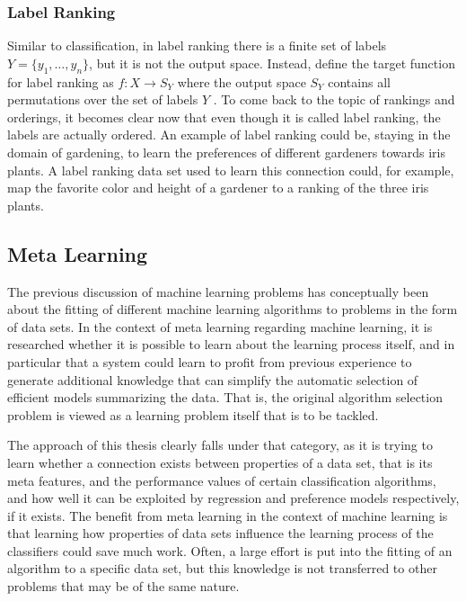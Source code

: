 \subsubsection{Label Ranking}
Similar to classification, in label ranking there is a finite set of labels $Y=\lbrace y_1,\dots,y_n \rbrace$, but it is not the output space. Instead, \citeauthor{DBLP:books/daglib/0025729} define the target function for label ranking as $f:X\rightarrow S_Y$ where the output space $S_Y$ contains all permutations over the set of labels $Y$ \cite{DBLP:books/daglib/0025729}. To come back to the topic of rankings and orderings, it becomes clear now that even though it is called label ranking, the labels are actually ordered. An example of label ranking could be, staying in the domain of gardening, to learn the preferences of different gardeners towards iris plants. A label ranking data set used to learn this connection could, for example, map the favorite color and height of a gardener to a ranking of the three iris plants. 

\subsection{Meta Learning}
The previous discussion of machine learning problems has conceptually been about the fitting of different machine learning algorithms to problems in the form of data sets. In the context of meta learning regarding machine learning, it is researched whether it is \textquotesingle possible to learn about the learning process itself, and in particular that a system could learn to profit from previous experience to generate additional knowledge that can simplify the automatic selection of efficient models summarizing the data\textquotesingle \cite{brazdil2008metalearning}. That is, the original algorithm selection problem \cite{rice1976algorithm} is viewed as a learning problem itself that is to be tackled.

The approach of this thesis clearly falls under that category, as it is trying to learn whether a connection exists between properties of a data set, that is its meta features, and the performance values of certain classification algorithms, and how well it can be exploited by regression and preference models respectively, if it exists. The benefit from meta learning in the context of machine learning is that learning how properties of data sets influence the learning process of the classifiers could save much work. Often, a large effort is put into the fitting of an algorithm to a specific data set, but this knowledge is not transferred to other problems that may be of the same nature.

